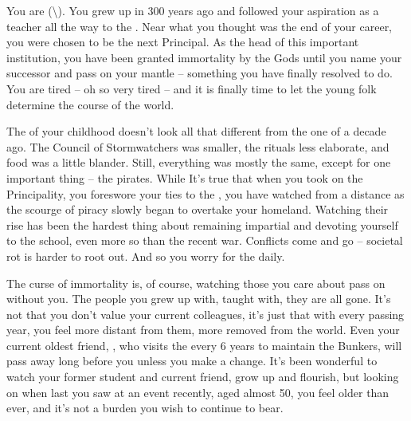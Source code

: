 \documentclass[char]{GL2020}
\begin{document}
\name{\cPrincipal{}}


You are \cPrincipal{} (\cPrincipal{\they}\textbackslash\cPrincipal{\them}). You grew up in \pShip{} 300 years ago and followed your aspiration as a teacher all the way to the \pSchool{}. Near what you thought was the end of your career, you were chosen to be the next Principal. As the head of this important institution, you have been granted immortality by the Gods until you name your successor and pass on your mantle -- something you have finally resolved to do. You are tired -- oh so very tired -- and it is finally time to let the young folk determine the course of the world.

The \pShip{} of your childhood doesn’t look all that different from the one of a decade ago. The Council of Stormwatchers was smaller, the rituals less elaborate, and food was a little blander. Still, everything was mostly the same, except for one important thing -- the pirates. While It’s true that when you took on the Principality, you foreswore your ties to the \pShippies{}, you have watched from a distance as the scourge of piracy slowly began to overtake your homeland. Watching their rise has been the hardest thing about remaining impartial and devoting yourself to the school, even more so than the recent war. Conflicts come and go -- societal rot is harder to root out. And so you worry for the \pShip{} daily.

The curse of immortality is, of course, watching those you care about pass on without you. The people you grew up with, taught with, they are all gone. It’s not that you don’t value your current colleagues, it's just that with every passing year, you feel more distant from them, more removed from the world. Even your current oldest friend, \cBunker{}, who visits the \pSc{} every 6 years to maintain the Bunkers, will pass away long before you unless you make a change.  It’s been wonderful to watch your former student and current friend, \cDiplomat{} grow up and flourish, but looking on \cDiplomat{\them} when last you saw \cDiplomat{\them} at an event recently, aged almost 50, you feel older than ever, and it’s not a burden you wish to continue to bear.
\end{document}
